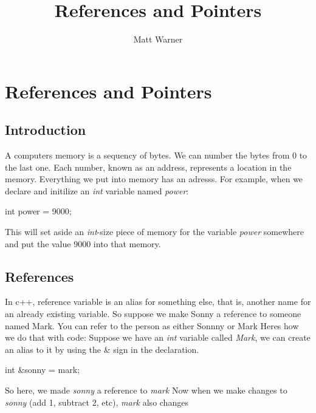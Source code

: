 \documentclass{report}
\title{\Huge{References and Pointers}}
\author{\huge{Matt Warner}}
\date{\huge{}}
\begin{document}
\tableofcontents
\newpage
\vspace{-10mm}\chapter*{References and Pointers}
  \section{Introduction}
A computers memory is a sequency of bytes. We can number the bytes from 0 to the last one. Each number, known as an address, represents a location in the memory.
\bigbreak \noindent
Everything we put into memory has an adresss. For example, when we declare and initilize an \textit{int} variable named \textit{power}:
\bigbreak \noindent
\centerline{int power = 9000;}
\bigbreak \noindent
This will set aside an \textit{int}-size piece of memory for the variable \textit{power} somewhere and put the value $9000$ into that memory.
\bigbreak \noindent
\section{References}
In c++, reference variable is an alias for something else, that is, another name for an already existing variable.
\bigbreak \noindent
So suppose we make Sonny a reference to someone named Mark. You can refer to the person as either Sonnny or Mark
\bigbreak \noindent
Heres how we do that with code:
\bigbreak \noindent
Suppose we have an \textit{int} variable called \textit{Mark}, we can create an alias to it by using the \& sign in the declaration.
\bigbreak \noindent
\centerline{int \&sonny = mark;}
\bigbreak \noindent
So here, we made \textit{sonny} a reference to \textit{mark}
\bigbreak \noindent
Now when we make changes to \textit{sonny} (add 1, subtract 2, etc), \textit{mark} also changes
\bigbreak \noindent
{}
\newpage
\end{document}

